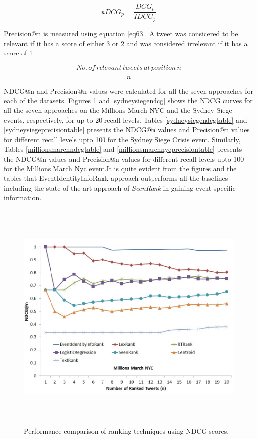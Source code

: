 \begin{equation}
\label{eq62}
nDCG_{p} = \frac{DCG_{p}}{IDCG_{p}} 
\end{equation}

Precision@n is measured using equation \ref{eq63}. A tweet was considered to be relevant if it has a score of either 3 or 2 and was considered irrelevant if it has a score of 1.

\begin{equation}
\label{eq63}
\frac{No.\,of\, relevant\, tweets\, at\, position\, n}{n}
\end{equation}

NDCG@n and Precision@n values were calculated for all the seven approaches for each of the datasets. Figures \ref{millionsmarchndcg} and \ref{sydneysiegendcg} shows the NDCG curves for all the seven approaches on the Millions March NYC and the Sydney Siege events, respectively, for up-to 20 recall levels. Tables \ref{sydneysiegendcgtable} and \ref{sydneysiegeprecisiontable} presents the NDCG@n values and Precision@n values for different recall levels upto 100 for the Sydney Siege Crisis event. Similarly, Tables \ref{millionsmarchndcgtable} and \ref{millionsmarchnycprecisiontable} presents the NDCG@n values and Precision@n values for different recall levels upto 100 for the Millions March Nyc event.It is quite evident from the figures and the tables that EventIdentityInfoRank approach outperforms all the baselines including the state-of-the-art approach of \textit{SeenRank} in gaining event-specific information.



\begin{figure}[htbp]
\centering
\includegraphics[height=4.5in,width=6in]{Figures/EventIdentityInfoRankPerformanceMillionsMarchNyc.jpg}
\caption{\small Performance comparison of ranking techniques using NDCG scores.}
\label{millionsmarchndcg}
\end{figure}

